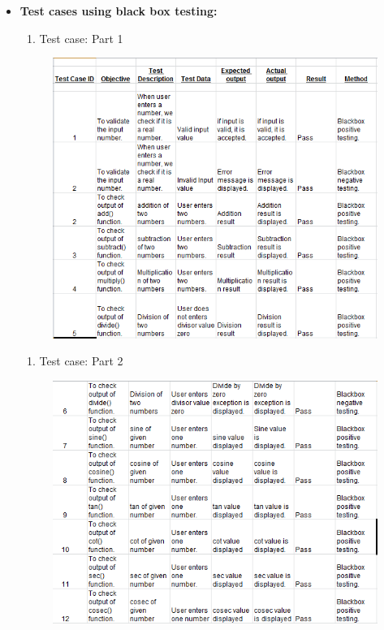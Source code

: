 \documentclass[a4paper,12pt]{article}
\begin{document}
\begin{itemize}
\newpage
\item \textbf{Test cases using black box testing:}
\begin{enumerate}
\item Test case: Part 1
\end{enumerate}
\begin{figure}[h!]
		\centering
		\includegraphics[scale=0.5]{testcase1.png}
	\end{figure}
    
\begin{enumerate}
\item Test case: Part 2
\end{enumerate}

\begin{figure}[h!]
		\centering
		\includegraphics[scale=0.5]{testcase2.png}
	\end{figure}
\end{itemize}
\bigskip
\bigskip
\bigskip
\bigskip
\bigskip
\bigskip
\bigskip
\bigskip
\bigskip
\bigskip
\bigskip
\bigskip
\bigskip
\bigskip
\bigskip
\bigskip
\bigskip
\bigskip
\bigskip
\bigskip
\bigskip
\bigskip
\bigskip
\bigskip
\bigskip
\end{document}
